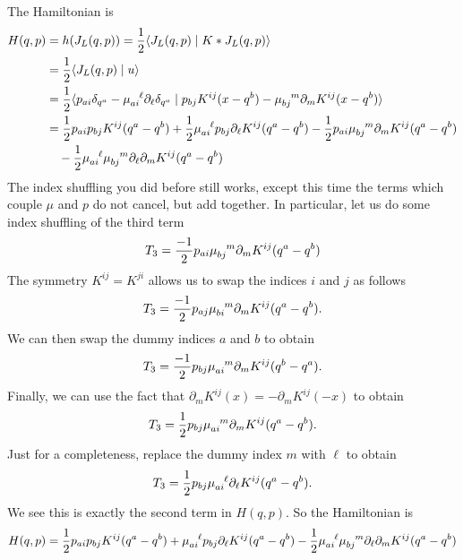 \documentclass[12pt]{amsart}
\begin{document}
The Hamiltonian is
\begin{align*}
  H(q,p) &= h(J_L(q,p)) = \frac{1}{2} \langle J_L(q,p) \mid K* J_L(q,p) \rangle \\
  &= \frac{1}{2} \langle J_L(q,p) \mid u \rangle \\
  &= \frac{1}{2} \langle p_{ai} \delta_{q^a} -  \mu \indices{_{ai}^\ell} \partial_\ell \delta_{q^a} \mid  p_{bj} K^{ij}(x-q^b) - \mu\indices{_{bj}^m} \partial_{m}K^{ij}(x-q^b) \rangle \\
  &= \frac{1}{2} p_{ai} p_{bj} K^{ij}(q^a - q^b) + \frac{1}{2} \mu \indices{_{ai}^\ell} p_{bj} \partial_\ell K^{ij}(q^a - q^b) - \frac{1}{2}  p_{ai} \mu \indices{_{bj}^m} \partial_m K^{ij}(q^a - q^b) \\
    &\quad - \frac{1}{2} \mu \indices{_{ai}^\ell} \mu \indices{_{bj}^m} \partial_\ell \partial_m K^{ij}(q^a - q^b)
\end{align*}
The index shuffling you did before still works, except this time the terms
which couple $\mu$ and $p$ do not cancel, but add together.
In particular, let us do some index shuffling of the third term
\begin{align*}
  T_3 = \frac{-1}{2} p_{ai} \mu\indices{_{bj}^m} \partial_m K^{ij}(q^a - q^b)
\end{align*}
The symmetry $K^{ij} = K^{ji}$
allows us to swap the indices $i$ and $j$ as follows
\begin{align*}
  T_3 = \frac{-1}{2} p_{aj} \mu\indices{_{bi}^m} \partial_m K^{ij}(q^a - q^b).
\end{align*}
We can then swap the dummy indices $a$ and $b$ to obtain
\begin{align*}
  T_3 = \frac{-1}{2} p_{bj} \mu\indices{_{ai}^m} \partial_m K^{ij}(q^b - q^a).
\end{align*}
Finally, we can use the fact that $\partial_m K^{ij}(x) = - \partial_m K^{ij}(-x)$ to obtain
\begin{align*}
  T_3 = \frac{1}{2} p_{bj} \mu\indices{_{ai}^m} \partial_m K^{ij}(q^a - q^b).
\end{align*}
Just for a completeness, replace the dummy index $m$ with $\ell$ to obtain
\begin{align*}
  T_3 = \frac{1}{2} p_{bj} \mu\indices{_{ai}^\ell} \partial_\ell K^{ij}(q^a - q^b).
\end{align*}
We see this is exactly the second term in $H(q,p)$.
So the Hamiltonian is
\begin{align*}
  H(q,p) = \frac{1}{2} p_{ai} p_{bj} K^{ij}(q^a - q^b)
  +\mu \indices{_{ai}^\ell} p_{bj} \partial_\ell K^{ij}(q^a - q^b) 
  - \frac{1}{2} \mu \indices{_{ai}^\ell} \mu \indices{_{bj}^m} \partial_\ell \partial_m K^{ij}(q^a - q^b)
\end{align*}





\end{document}
